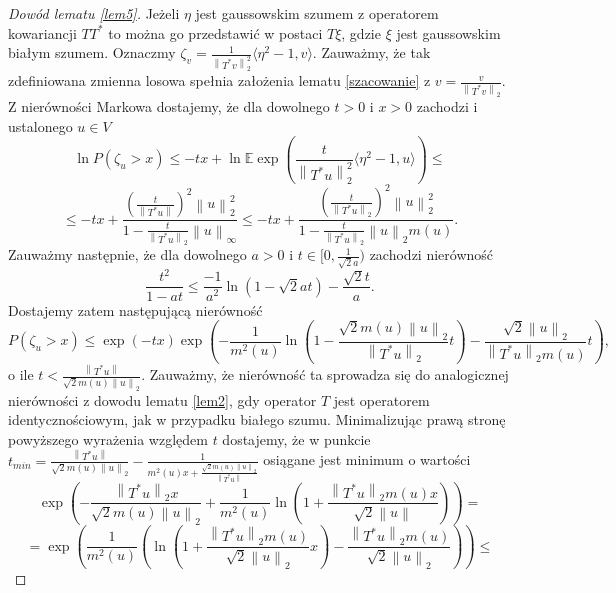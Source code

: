 \documentclass{mwart}
\newcommand{\norm}[1]{\left\lVert#1\right\rVert}
\begin{document}
\begin{proof}[Dowód lematu \ref{lem5}]
Jeżeli $\eta$ jest gaussowskim szumem z operatorem kowariancji $TT^*$ to można go przedstawić w postaci $T\xi$, gdzie $\xi$ jest gaussowskim białym szumem. Oznaczmy $\zeta_v=\frac{1}{\norm{T^*v}_2^2}\langle \eta^2-1,v\rangle$. Zauważmy, że tak zdefiniowana zmienna losowa spełnia założenia lematu \ref{szacowanie} z $v=\frac{v}{\norm{T^*v}_2}$. Z nierówności Markowa dostajemy, że dla dowolnego $t>0$ i $x>0$ zachodzi i ustalonego $u\in V$
\begin{displaymath}
\ln P(\zeta_u>x)\leq -tx+\ln\mathbb{E}\exp\left(\frac{t}{\norm{T^*u}_2^2}\langle \eta^2-1,u\rangle\right)\leq
\end{displaymath}
\begin{displaymath}
\leq -tx+\frac{\left(\frac{t}{\norm{T^*u}}\right)^2\norm{u}_2^2}{1-\frac{t}{\norm{T^*u}_2}\norm{u}_{\infty}}\leq -tx+\frac{\left(\frac{t}{\norm{T^*u}_2}\right)^2\norm{u}_2^2}{1-\frac{t}{\norm{T^*u}_2}\norm{u}_{2}m(u)}.
\end{displaymath}
Zauważmy następnie, że dla dowolnego $a>0$ i $t\in [0,\frac{1}{\sqrt{2}a})$ zachodzi nierówność
\begin{displaymath}
\frac{t^2}{1-at}\leq \frac{-1}{a^2}\ln(1-\sqrt{2}at)-\frac{\sqrt{2}t}{a}.
\end{displaymath}
Dostajemy zatem następującą nierówność
\begin{displaymath}
P(\zeta_u>x)\leq \exp(-tx)\exp\left(-\frac{1}{m^2(u)}\ln\left(1-\frac{\sqrt{2}m(u)\norm{u}_2}{\norm{T^*u}_2}t\right)-\frac{\sqrt{2}\norm{u}_2}{\norm{T^*u}_2m(u)}t\right),
\end{displaymath}
o ile $t<\frac{\norm{T^*u}}{\sqrt{2}m(u)\norm{u}_2}.$ Zauważmy, że nierówność ta sprowadza się do analogicznej nierówności z dowodu lematu \ref{lem2}, gdy operator $T$ jest operatorem identycznościowym, jak w przypadku białego szumu.
Minimalizując prawą stronę powyższego wyrażenia względem $t$ dostajemy, że w punkcie $t_{min}=\frac{\norm{T^*u}}{\sqrt{2}m(u)\norm{u}_2}-\frac{1}{m^2(u)x+\frac{\sqrt{2}m(u)\norm{u}_2}{\norm{T^*u}}} $ osiągane jest minimum o wartości 
\begin{displaymath}
\exp\left(-\frac{\norm{T^*u}_2x}{\sqrt{2}m(u)\norm{u}_2}+\frac{1}{m^2(u)}\ln\left(1+\frac{\norm{T^*u}_2m(u)x}{\sqrt{2}\norm{u}}\right) \right)=
\end{displaymath}
\begin{displaymath}
=\exp\left(\frac{1}{m^2(u)}\left(\ln \left(1+\frac{\norm{T^*u}_2m(u)}{\sqrt{2}\norm{u}_2}x\right)-\frac{\norm{T^*u}_2m(u)}{\sqrt{2}\norm{u}_2}\right)\right)\leq 

\end{displaymath}
\end{proof}
\end{document}
